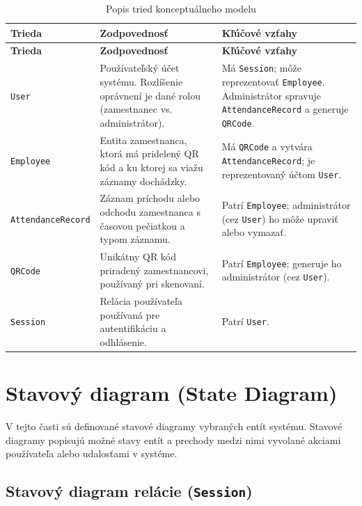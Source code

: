 \renewcommand{\arraystretch}{1.2}
\setlength{\tabcolsep}{4pt}
\footnotesize
\begin{longtable}{|p{3.2cm}|p{4.5cm}|p{6.5cm}|}
\caption{Popis tried konceptuálneho modelu}\label{t:classes}\\
\hline
\textbf{Trieda} & \textbf{Zodpovednosť} & \textbf{Kľúčové vzťahy} \\
\hline
\endfirsthead
\hline
\textbf{Trieda} & \textbf{Zodpovednosť} & \textbf{Kľúčové vzťahy} \\
\hline
\endhead
\texttt{User} &
Používateľský účet systému. Rozlíšenie oprávnení je dané rolou (zamestnanec vs. administrátor). &
Má \texttt{Session}; môže reprezentovať \texttt{Employee}. Administrátor spravuje \texttt{AttendanceRecord} a generuje \texttt{QRCode}. \\
\hline
\texttt{Employee} &
Entita zamestnanca, ktorá má pridelený QR kód a ku ktorej sa viažu záznamy dochádzky. &
Má \texttt{QRCode} a vytvára \texttt{AttendanceRecord}; je reprezentovaný účtom \texttt{User}. \\
\hline
\texttt{AttendanceRecord} &
Záznam príchodu alebo odchodu zamestnanca s časovou pečiatkou a typom záznamu. &
Patrí \texttt{Employee}; administrátor (cez \texttt{User}) ho môže upraviť alebo vymazať. \\
\hline
\texttt{QRCode} &
Unikátny QR kód priradený zamestnancovi, používaný pri skenovaní. &
Patrí \texttt{Employee}; generuje ho administrátor (cez \texttt{User}). \\
\hline
\texttt{Session} &
Relácia používateľa používaná pre autentifikáciu a odhlásenie. &
Patrí \texttt{User}. \\
\hline
\end{longtable}
\normalsize

\section{Stavový diagram (State Diagram)}

V tejto časti sú definované stavové diagramy vybraných entít systému. Stavové diagramy
popisujú možné stavy entít a prechody medzi nimi vyvolané akciami používateľa alebo
udalosťami v systéme.

\subsection{Stavový diagram relácie (\texttt{Session})}

